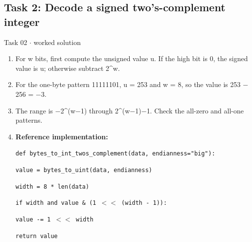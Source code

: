 \documentclass[11pt]{article}
\begin{document}
\begin{keepsection}\subsection{Task 2: Decode a signed two’s-complement integer}

\begin{workedbox}{Task 02 \ensuremath{\cdot} worked solution}
\begin{enumerate}
\item For w bits, first compute the unsigned value u. If the high bit is 0, the signed value is u; otherwise subtract 2\textasciicircum{}w.
\item For the one-byte pattern 11111101, u = 253 and w = 8, so the value is 253 \ensuremath{-} 256 = \ensuremath{-}3.
\item The range is \ensuremath{-}2\textasciicircum{}(w\ensuremath{-}1) through 2\textasciicircum{}(w\ensuremath{-}1)\ensuremath{-}1. Check the all-zero and all-one patterns.
\item {}
\textbf{Reference implementation:}
\begin{tcolorbox}[colback=Paperblue,colframe=Paperblue,boxrule=0pt,arc=0pt,left=7pt,right=7pt,top=5pt,bottom=5pt]\small\sloppy
\noindent\hspace*{0em}\texttt{def bytes\_to\_int\_twos\_complement(data, endianness="big"):}\par
\noindent\hspace*{1em}\texttt{value = bytes\_to\_uint(data, endianness)}\par
\noindent\hspace*{1em}\texttt{width = 8 * len(data)}\par
\noindent\hspace*{1em}\texttt{if width and value \& (1 \ensuremath{<}\ensuremath{<} (width - 1)):}\par
\noindent\hspace*{3em}\texttt{value -= 1 \ensuremath{<}\ensuremath{<} width}\par
\noindent\hspace*{1em}\texttt{return value}\par
\end{tcolorbox}
\end{enumerate}
\end{workedbox}

\end{keepsection}
\end{document}
